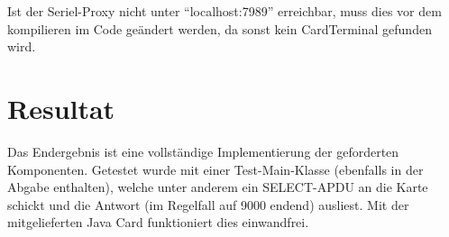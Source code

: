 \documentclass[paper=a4, fontsize=11pt]{scrartcl}
\begin{document}
Ist der Seriel-Proxy nicht unter \enquote{localhost:7989} erreichbar, muss dies vor dem kompilieren im Code geändert werden, da sonst kein CardTerminal gefunden wird.


\section{Resultat}
Das Endergebnis ist eine vollständige Implementierung der geforderten Komponenten. Getestet wurde mit einer Test-Main-Klasse (ebenfalls in der Abgabe enthalten), welche unter anderem ein SELECT-APDU an die Karte schickt und die Antwort (im Regelfall auf 9000 endend) ausliest. Mit der mitgelieferten Java Card funktioniert dies  einwandfrei.
\end{document}
